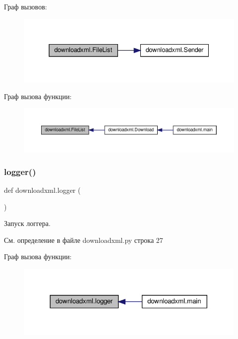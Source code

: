 Граф вызовов\+:\nopagebreak
\begin{figure}[H]
\begin{center}
\leavevmode
\includegraphics[width=331pt]{namespacedownloadxml_ae15b4d4f7f282d34e48e03a2452741d6_cgraph}
\end{center}
\end{figure}
Граф вызова функции\+:\nopagebreak
\begin{figure}[H]
\begin{center}
\leavevmode
\includegraphics[width=350pt]{namespacedownloadxml_ae15b4d4f7f282d34e48e03a2452741d6_icgraph}
\end{center}
\end{figure}
\mbox{\label{namespacedownloadxml_abc3f6c8d51f9a903bb8504a7ad9ad2de}} 
\subsubsection{\texorpdfstring{logger()}{logger()}}
{\footnotesize\ttfamily def downloadxml.\+logger (\begin{DoxyParamCaption}{ }\end{DoxyParamCaption})}



Запуск логгера. 



См. определение в файле downloadxml.\+py строка 27

Граф вызова функции\+:\nopagebreak
\begin{figure}[H]
\begin{center}
\leavevmode
\includegraphics[width=317pt]{namespacedownloadxml_abc3f6c8d51f9a903bb8504a7ad9ad2de_icgraph}
\end{center}
\end{figure}
\mbox{\label{namespacedownloadxml_ac0d6bf93a1be6263a0b94ef18bb9c459}} 
